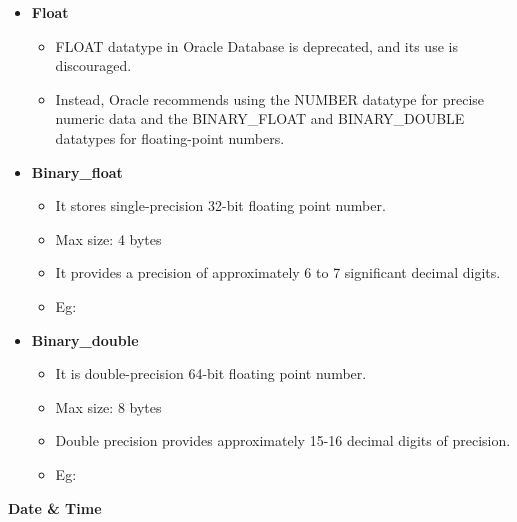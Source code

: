 \begin{flushleft}
\begin{itemize}
\begin{itemize}
		\end{itemize}
		
			\item \textbf{Float}
			\begin{itemize}
				\item FLOAT datatype in Oracle Database is deprecated, and its use is discouraged. 
				\item Instead, Oracle recommends using the NUMBER datatype for precise numeric data and the BINARY\_FLOAT and BINARY\_DOUBLE datatypes for floating-point numbers.
			\end{itemize}
			
			\item \textbf{Binary\_float}
			\begin{itemize}
				\item It stores single-precision 32-bit floating point number. 
				\item Max size: 4 bytes
				\item It provides a precision of approximately 6 to 7 significant decimal digits.
				\item Eg:
			\end{itemize}
			
			\item \textbf{Binary\_double}
			\begin{itemize}
				\item It is double-precision 64-bit floating point number. 
				\item Max size: 8 bytes
				\item Double precision provides approximately 15-16 decimal digits of precision.
				\item Eg:
			\end{itemize}		
					
		\end{itemize}
		
		
		\newpage
		\item \textbf{Date \& Time}
		

\end{flushleft}
